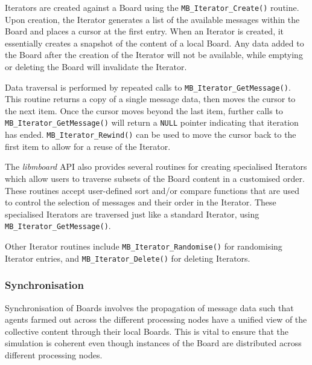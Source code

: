 Iterators are created against a Board using the \texttt{MB\_Iterator\_Create()} routine. Upon creation, the Iterator generates a list of the available messages within the Board and places a cursor at the first entry. When an Iterator is created, it essentially creates a snapshot of the content of a local Board. Any data added to the Board after the creation of the Iterator will not be available, while emptying or deleting the Board will invalidate the Iterator.

Data traversal is performed by repeated calls to \texttt{MB\_Iterator\_GetMessage()}. This routine returns a copy of a single message data, then moves the cursor to the next item. Once the cursor moves beyond the last item, further calls to \texttt{MB\_Iterator\_GetMessage()} will return a \texttt{NULL} pointer indicating that iteration has ended. \texttt{MB\_Iterator\_Rewind()} can be used to move the cursor back to the first item to allow for a reuse of the Iterator.

The \textit{libmboard} API also provides several routines for creating specialised Iterators which allow users to traverse subsets of the Board content in a customised order. These routines accept user-defined sort and/or compare functions that are used to control the selection of messages and their order in the Iterator. These specialised Iterators are traversed just like a standard Iterator, using \texttt{MB\_Iterator\_GetMessage()}.

Other Iterator routines include \texttt{MB\_Iterator\_Randomise()} for randomising Iterator entries, and \texttt{MB\_Iterator\_Delete()} for deleting Iterators.


\subsubsection{Synchronisation}
\label{sec:mb_sync}

Synchronisation of Boards involves the propagation of message data such that agents farmed out across the different processing nodes have a unified view of the collective content through their local Boards. This is vital to ensure that the simulation is coherent even though instances of the Board are distributed across different processing nodes.

